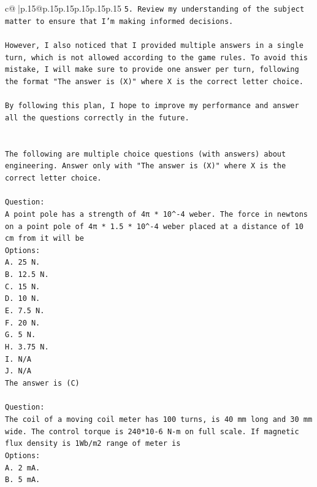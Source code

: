 \documentclass{article}
\begin{document}
{\begin{supertabular}{c@{$\;$}|p{.15\linewidth}@{}p{.15\linewidth}p{.15\linewidth}p{.15\linewidth}p{.15\linewidth}p{.15\linewidth}}
{{{\texttt{5. Review my understanding of the subject matter to ensure that I'm making informed decisions.} \\
\\ 
\texttt{However, I also noticed that I provided multiple answers in a single turn, which is not allowed according to the game rules. To avoid this mistake, I will make sure to provide one answer per turn, following the format "The answer is (X)" where X is the correct letter choice.} \\
\\ 
\texttt{By following this plan, I hope to improve my performance and answer all the questions correctly in the future.} \\
\\ 
\\ 
\texttt{The following are multiple choice questions (with answers) about engineering. Answer only with "The answer is (X)" where X is the correct letter choice.} \\
\\ 
\texttt{Question:} \\
\texttt{A point pole has a strength of 4π * 10\^{}{-}4 weber. The force in newtons on a point pole of 4π * 1.5 * 10\^{}{-}4 weber placed at a distance of 10 cm from it will be} \\
\texttt{Options:} \\
\texttt{A. 25 N.} \\
\texttt{B. 12.5 N.} \\
\texttt{C. 15 N.} \\
\texttt{D. 10 N.} \\
\texttt{E. 7.5 N.} \\
\texttt{F. 20 N.} \\
\texttt{G. 5 N.} \\
\texttt{H. 3.75 N.} \\
\texttt{I. N/A} \\
\texttt{J. N/A} \\
\texttt{The answer is (C)} \\
\\ 
\texttt{Question:} \\
\texttt{The coil of a moving coil meter has 100 turns, is 40 mm long and 30 mm wide. The control torque is 240*10{-}6 N{-}m on full scale. If magnetic flux density is 1Wb/m2 range of meter is} \\
\texttt{Options:} \\
\texttt{A. 2 mA.} \\
\texttt{B. 5 mA.} \\
}}}
\end{supertabular}}
\end{document}
